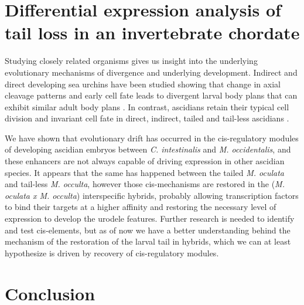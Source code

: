 \section{Differential expression analysis of tail loss in an invertebrate chordate}
Studying closely related organisms gives us insight into the underlying evolutionary mechanisms of divergence and underlying development. Indirect and direct developing sea urchins have been studied showing that change in axial cleavage patterns and early cell fate leads to divergent larval body plans that can exhibit similar adult body plans \cite{wray_evolutionary_1989,henry_evolutionary_1990}. In contrast, ascidians retain their typical cell division and invariant cell fate in direct, indirect, tailed and tail-less ascidians \cite{jeffery_evolutionary_1991,maliska_molgula_2010}. 
   
We have shown that evolutionary drift has occurred in the cis-regulatory modules of developing ascidian embryos between \textit{C. intestinalis} and \textit{M. occidentalis}, and these enhancers are not always capable of driving expression in other ascidian species. It appears that the same has happened between the tailed \textit{M. oculata} and tail-less \textit{M. occulta}, however those cis-mechanisms are restored in the (\textit{M. oculata x M. occulta}) interspecific hybrids, probably allowing transcription factors to bind their targets at a higher affinity and restoring the necessary level of expression to develop the urodele features. Further research is needed to identify and test cis-elements, but as of now we have a better understanding behind the mechanism of the restoration of the larval tail in hybrids, which we can at least hypothesize is driven by recovery of cis-regulatory modules.

\section{Conclusion}

